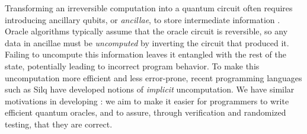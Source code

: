 Transforming an irreversible computation into a quantum circuit often requires introducing ancillary qubits, or \emph{ancillae}, to store intermediate information \cite[Chapter 3.2]{mike-and-ike}.
Oracle algorithms typically assume that the oracle circuit is reversible, so any data in ancillae must be \emph{uncomputed} by inverting the circuit that produced it.
Failing to uncompute this information leaves it entangled with the rest of the state, potentially leading to incorrect program behavior.
To make this uncomputation more efficient and less error-prone, recent programming languages such as Silq \cite{sliqlanguage} have developed notions of \emph{implicit} uncomputation.
We have similar motivations in developing \name: we aim to make it easier for programmers to write efficient quantum oracles, and to assure, through verification and randomized testing, that they are correct.



